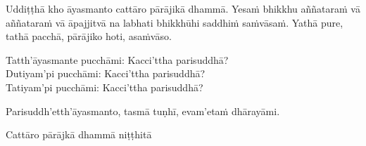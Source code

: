 \ifafiveversion \clearpage \else \medskip \fi

\begin{center}
	Uddiṭṭhā kho āyasmanto cattāro pārājikā dhammā. Yesaṁ bhikkhu aññataraṁ vā aññataraṁ vā āpajjitvā na labhati bhikkhūhi saddhiṁ saṁvāsaṁ. Yathā pure, tathā pacchā, pārājiko hoti, asaṁvāso.

	\smallskip

	Tatth'āyasmante pucchāmi: Kacci'ttha parisuddhā?\\
	Dutiyam'pi pucchāmi: Kacci'ttha parisuddhā?\\
	Tatiyam'pi pucchāmi: Kacci'ttha parisuddhā?

	\smallskip

	Parisuddh'etth'āyasmanto, tasmā tuṇhī, evam'etaṁ dhārayāmi.
\end{center}

\begin{outro}
	Cattāro pārājkā dhammā niṭṭhitā\makeatletter\hyperlink{endnote10-appendix}\makeatother
\end{outro}

\clearpage

